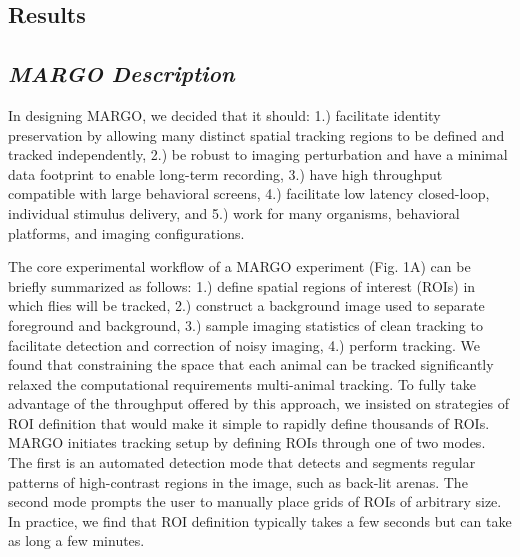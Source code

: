 \documentclass[10pt]{article}
\begin{document}
\begin{multicols}{2}
\section*{Results}

\subsection*{\textit{MARGO Description}}

In designing MARGO, we decided that it should: 1.) facilitate identity preservation by allowing many distinct spatial tracking regions to be defined and tracked independently, 2.) be robust to imaging perturbation and have a minimal data footprint to enable long-term recording, 3.) have high throughput compatible with large behavioral screens, 4.) facilitate low latency closed-loop, individual stimulus delivery, and 5.) work for many organisms, behavioral platforms, and imaging configurations.

The core experimental workflow of a MARGO experiment (Fig. 1A) can be briefly summarized as follows: 1.) define spatial regions of interest (ROIs) in which flies will be tracked, 2.) construct a background image used to separate foreground and background, 3.) sample imaging statistics of clean tracking to facilitate detection and correction of noisy imaging, 4.) perform tracking.  We found that constraining the space that each animal can be tracked significantly relaxed the computational requirements multi-animal tracking. To fully take advantage of the throughput offered by this approach, we insisted on strategies of ROI definition that would make it simple to rapidly define thousands of ROIs. MARGO initiates tracking setup by defining ROIs through one of two modes. The first is an automated detection mode that detects and segments regular patterns of high-contrast regions in the image, such as back-lit arenas. The second mode prompts the user to manually place grids of ROIs of arbitrary size. In practice, we find that ROI definition typically takes a few seconds but can take as long a few minutes.


\end{multicols}
\end{document}
